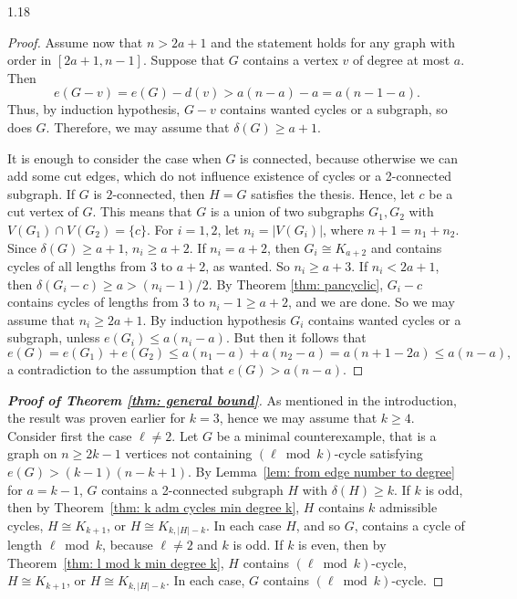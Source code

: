 \documentclass[10pt]{article}
\let\geq\geqslant
\let\leq\leqslant
\begin{document}
\begin{spacing}{1.18}
\begin{proof}
    Assume now that $n>2a+1$ and the statement holds for any graph with order in $[2a+1,n-1]$. Suppose that $G$ contains a vertex $v$ of degree at most $a$. Then
\[
e(G-v)
=e(G)-d(v)
>a(n-a)-a
=a(n-1-a).
\]
    Thus, by induction hypothesis, $G-v$ contains wanted cycles or a subgraph, so does $G$. Therefore, we may assume that $\delta(G) \geq a+1$. 

    It is enough to consider the case when $G$ is connected, because otherwise we can add some cut edges, which do not influence existence of cycles or a 2-connected subgraph. 
    If $G$ is $2$-connected, then $H=G$ satisfies the thesis. Hence, let $c$ be a cut vertex of $G$. This means that $G$ is a union of two subgraphs $G_1,G_2$ with $V(G_1)\cap V(G_2)=\{c\}$. For $i=1,2$, let $n_i=|V(G_i)|$, where $n+1=n_1+n_2$. Since $\delta(G)\geq a+1$, $n_i\geq a+2$. If $n_i=a+2$, then $G_i \cong K_{a+2}$ and contains cycles of all lengths from $3$ to $a+2$, as wanted. So $n_i \geq a+3$.     
    If $n_i<2a+1$, then $\delta(G_i-c)\geq a>(n_i-1)/2$. By Theorem \ref{thm: pancyclic}, $G_i-c$ contains cycles of lengths from $3$ to $n_i-1 \geq a+2$, and we are done. So we may assume that $n_i\geq 2a+1$. By induction hypothesis $G_i$ contains wanted cycles or a subgraph, unless $e(G_i) \leq a(n_i-a)$. But then it follows that
    \[
     e(G)
     =e(G_1)+e(G_2)
     \leqslant a(n_1-a)+a(n_2-a)=a(n+1-2a) \leq a(n-a),
    \]
    a contradiction to the assumption that $e(G)>a(n-a)$.
\end{proof}

\begin{proof}[\bf Proof of Theorem \ref{thm: general bound}]
    As mentioned in the introduction, the result was proven earlier for $k=3$, hence we may assume that $k \geqslant 4$. 
    Consider first the case $\ell \not= 2$. Let $G$ be a minimal counterexample, that is a graph on $n \geq 2k-1$ vertices not containing $(\ell \bmod k)$-cycle satisfying $e(G) > (k-1)(n-k+1)$. By Lemma~\ref{lem: from edge number to degree} for $a=k-1$, $G$ contains a 2-connected subgraph $H$ with $\delta(H) \geq k$. 
    If $k$ is odd, then by Theorem~\ref{thm: k adm cycles min degree k}, $H$ contains $k$ admissible cycles, $H \cong K_{k+1}$, or $H \cong K_{k,|H|-k}$. In each case $H$, and so $G$, contains a cycle of length $\ell \bmod k$, because $\ell \not=2$ and $k$ is odd. 
    If $k$ is even, then by Theorem~\ref{thm: l mod k min degree k}, $H$ contains $(\ell \bmod k)$-cycle, $H \cong K_{k+1}$, or $H \cong K_{k,|H|-k}$. In each case, $G$ contains $(\ell \bmod k)$-cycle.  


\end{proof}
\end{spacing}
\end{document}
